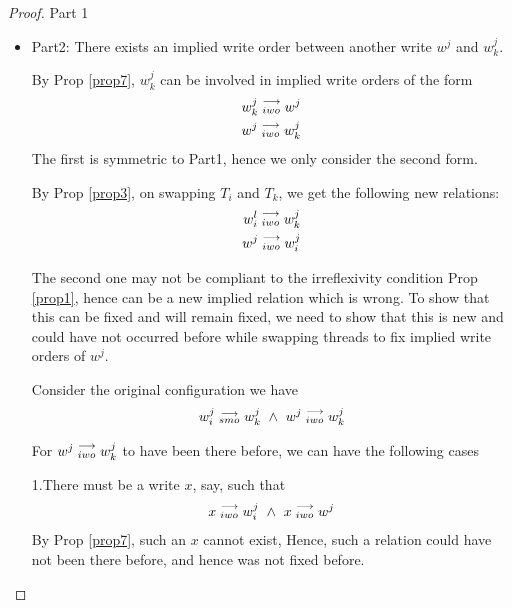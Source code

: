 \begin{proof}{Part 1}
\begin{itemize}
                    \item Part2: There exists an implied write order between another write $w^j$ and $w_k^j$. 

                        By Prop \ref{prop7}, $w_k^j$ can be involved in implied write orders of the form
                        \begin{align*}
                            w_k^j\stackrel{\longrightarrow}{_{iwo}}w^j \\
                            w^j\stackrel{\longrightarrow}{_{iwo}}w_k^j 
                        \end{align*}
                        The first is symmetric to Part1, hence we only consider the second form. 

                        By Prop \ref{prop3}, on swapping $T_i$ and $T_k$, we get the following new relations:
                        \begin{align*}
                            w_i^l\stackrel{\longrightarrow}{_{iwo}}w_k^j \\
                            w^j\stackrel{\longrightarrow}{_{iwo}}w_i^j
                        \end{align*}

                        The second one may not be compliant to the irreflexivity condition Prop \ref{prop1}, hence can be a new implied    relation which is wrong. To show that this can be fixed and will remain fixed, we need to show that this is new and could have not occurred before while swapping threads to fix implied write orders of $w^j$. 

                        Consider the original configuration we have 
                        \begin{align*}
                            \reln{w_i^j}{smo}{w_k^j} \ \wedge \ \reln{w^j}{iwo}{w_k^j}
                        \end{align*}

                        For $w^j\stackrel{\longrightarrow}{_{iwo}}w_k^j$ to have been there before, we can have the following cases 
                        
                        1.There must be a write $x$, say, such that 
                        \begin{align*}
                            \reln{x}{iwo}{w_i^j} \ \wedge \ \reln{x}{iwo}{w^j}
                        \end{align*}
                        By Prop \ref{prop7}, such an $x$ cannot exist, Hence, such a relation could have not been there before, and hence was not fixed before.


\end{itemize}
\end{proof}
